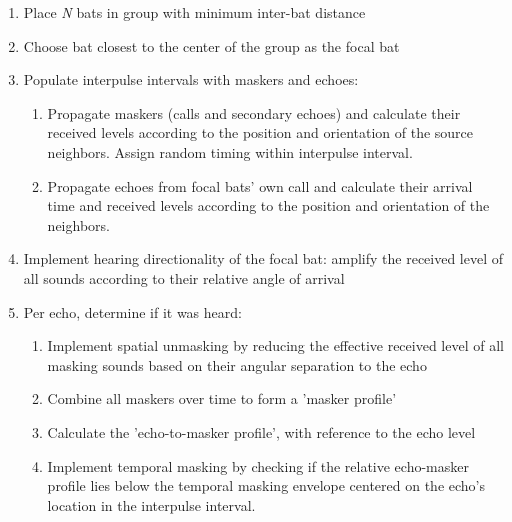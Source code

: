 \documentclass[
]{book}
\begin{document}
\begin{enumerate}
  \item Place \textit{N} bats in group with minimum inter-bat distance
  \item Choose bat closest to the center of the group as the focal bat
  \item Populate interpulse intervals with maskers and echoes:
    \begin{enumerate}
    \item Propagate maskers (calls and secondary echoes) and calculate their received levels according to the position and orientation of the source neighbors. Assign random timing within interpulse interval.
    \item Propagate echoes from focal bats' own call and calculate their arrival time and received levels according to the position and orientation of the neighbors.
    \end{enumerate}
  \item Implement hearing directionality of the focal bat: amplify the received level of all sounds according to their relative angle of arrival
  \item Per echo, determine if it was heard:
    \begin{enumerate}
      \item Implement spatial unmasking by reducing the effective received level of all masking sounds based on their angular separation to the echo
      \item Combine all maskers over time to form a 'masker profile'
      \item Calculate the 'echo-to-masker profile', with reference to the echo level
      \item Implement temporal masking by checking if the relative echo-masker profile lies below the temporal masking envelope centered on the echo's location in the interpulse interval.
    \end{enumerate}
\end{enumerate}

\newpage
\end{document}
